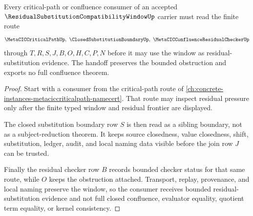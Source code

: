 \begin{theorem}
\label{thm:residual-substitution-compatibility-window-critical-path-handoff}
Every critical-path or confluence consumer of an accepted $\ResidualSubstitutionCompatibilityWindowUp$ carrier must read the finite route
$$
\MetaCICCriticalPathUp,\ \ClosedSubstitutionBoundaryUp,\ \MetaCICConfluenceResidualCheckerUp
$$
through $T,R,S,J,B,O,H,C,P,N$ before it may use the window as residual-substitution evidence. The handoff preserves the bounded obstruction and exports no full confluence theorem.
\end{theorem}
\begin{proof}
Start with a consumer from the critical-path route of \autoref{ch:concrete-instances-metaciccriticalpath-namecert}. That route may inspect residual pressure only after the finite typed window and residual frontier are displayed.

The closed substitution boundary row $S$ is then read as a sibling boundary, not as a subject-reduction theorem. It keeps source closedness, value closedness, shift, substitution, ledger, audit, and local naming data visible before the join row $J$ can be trusted.

Finally the residual checker row $B$ records bounded checker status for that same route, while $O$ keeps the obstruction attached. Transport, replay, provenance, and local naming preserve the window, so the consumer receives bounded residual-substitution evidence and not full closed confluence, evaluator equality, quotient term equality, or kernel consistency.
\end{proof}



